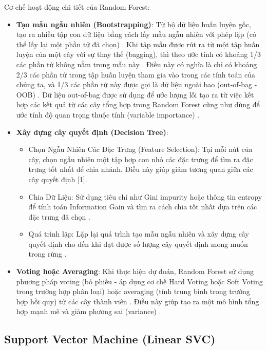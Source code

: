 Cơ chế hoạt động chi tiết của Random Forest:
\begin{itemize}
\item \textbf{Tạo mẫu ngẫu nhiên (Bootstrapping)}: Từ bộ dữ liệu huấn luyện gốc, tạo ra nhiều tập con dữ liệu bằng cách lấy mẫu ngẫu nhiên với phép lặp (có thể lấy lại một phần tử đã chọn) \cite{hastie2009elements}. Khi tập mẫu được rút ra từ một tập huấn luyện của một cây với sự thay thế (bagging), thì theo ước tính có khoảng 1/3 các phần tử không nằm trong mẫu này \cite{hastie2009elements}. Điều này có nghĩa là chỉ có khoảng 2/3 các phần tử trong tập huấn luyện tham gia vào trong các tính toán của chúng ta, và 1/3 các phần tử này được gọi là dữ liệu ngoài bao (out-of-bag - OOB) \cite{hastie2009elements}. Dữ liệu out-of-bag được sử dụng để ước lượng lỗi tạo ra từ việc kết hợp các kết quả từ các cây tổng hợp trong Random Forest cũng như dùng để ước tính độ quan trọng thuộc tính (variable importance) \cite{hastie2009elements}.

\item \textbf{Xây dựng cây quyết định (Decision Tree)}:
\begin{itemize}
	\item [$\circ$] Chọn Ngẫu Nhiên Các Đặc Trưng (Feature Selection): Tại mỗi nút của cây, chọn ngẫu nhiên một tập hợp con nhỏ các đặc trưng để tìm ra đặc trưng tốt nhất để chia nhánh. Điều này giúp giảm tương quan giữa các cây quyết định [1].
	\item [$\circ$] Chia Dữ Liệu: Sử dụng tiêu chí như Gini impurity hoặc thông tin entropy để tính toán Information Gain và tìm ra cách chia tốt nhất dựa trên các đặc trưng đã chọn \cite{hastie2009elements}.
	\item [$\circ$] Quá trình lặp: Lặp lại quá trình tạo mẫu ngẫu nhiên và xây dựng cây quyết định cho đến khi đạt được số lượng cây quyết định mong muốn trong rừng \cite{hastie2009elements}.
\end{itemize}
\item \textbf{Voting hoặc Averaging}: Khi thực hiện dự đoán, Random Forest sử dụng phương pháp voting (bỏ phiếu - áp dụng cơ chế Hard Voting hoặc Soft Voting trong trường hợp phân loại) hoặc averaging (tính trung bình trong trường hợp hồi quy) từ các cây thành viên \cite{hastie2009elements}. Điều này giúp tạo ra một mô hình tổng hợp mạnh mẽ và giảm phương sai (variance) \cite{hastie2009elements}.
\end{itemize}

\subsection{Support Vector Machine (Linear SVC)}

